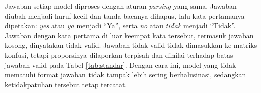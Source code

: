 Jawaban setiap model diproses dengan aturan \textit{parsing} yang sama. Jawaban diubah menjadi huruf kecil dan tanda bacanya dihapus, lalu kata pertamanya dipetakan: \textit{yes} atau \textit{ya} menjadi ``Ya'', serta \textit{no} atau \textit{tidak} menjadi ``Tidak''. Jawaban dengan kata pertama di luar keempat kata tersebut, termasuk jawaban kosong, dinyatakan tidak valid. Jawaban tidak valid tidak dimasukkan ke matriks konfusi, tetapi proporsinya dilaporkan terpisah dan dinilai terhadap batas jawaban valid pada Tabel \ref{tab:standar}. Dengan cara ini, model yang tidak mematuhi format jawaban tidak tampak lebih sering berhalusinasi, sedangkan ketidakpatuhan tersebut tetap tercatat.
%

